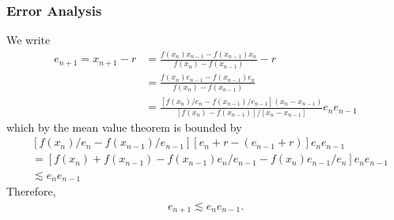 \documentclass[12pt,reqno]{amsart}
\numberwithin{equation}{section}  %
\begin{document}
\subsubsection{Error Analysis}
We write
\begin{align*}
e_{n+1} = x_{n+1}-r
& = \frac{f(x_n)x_{n-1} - f(x_{n-1})x_n}{f(x_n) - f(x_{n-1})} - r
\\
& = \frac{f(x_n)e_{n-1} - f(x_{n-1})e_n}{f(x_n) - f(x_{n-1})}
\\
& = \frac{[f(x_n)/e_n - f(x_{n-1})/e_{n-1}](x_n - x_{n-1})}{[f(x_n) - f(x_{n-1})]/[x_n - x_{n-1}]}e_n e_{n-1}
\end{align*}
which by the mean value theorem is bounded by
\begin{align*}
& [f(x_n)/e_n - f(x_{n-1})/e_{n-1}][e_n + r - (e_{n-1} + r)]e_n e_{n-1}
\\
& = [f(x_n)  + f(x_{n-1}) - f(x_{n-1})e_n / e_{n-1} - f(x_n)e_{n-1}/e_n]e_n e_{n-1} 
\\
& \lesssim e_n e_{n-1}
\end{align*}
Therefore,
\begin{align*}
e_{n+1} \lesssim e_n e_{n-1}.
\end{align*}
\end{document}
